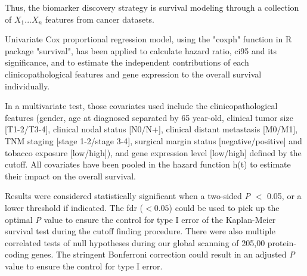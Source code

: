 \documentclass[jpm,article,submit,moreauthors,pdftex]{Definitions/mdpi}
\newenvironment{MyColorPar}[1]{%
    \leavevmode\color{#1}\ignorespaces%
}{%
}%
\begin{document}
\begin{paracol}{2}
\begin{MyColorPar}{red}
Thus, the biomarker discovery strategy is survival modeling through a collection of $X_1...X_n$ features from cancer datasets.%

Univariate Cox proportional regression model, using the "coxph" function in R package "survival", has been applied to calculate hazard ratio, \acrfull{ci95} and its significance, and to estimate the independent contributions of each clinicopathological features and gene expression to the overall survival individually.


In a multivariate test, those covariates used include the clinicopathological features (gender, age at diagnosed separated by 65 year-old, clinical tumor size [T1-2/T3-4], clinical nodal status [N0/N+], clinical distant metastasis [M0/M1], TNM staging [stage 1-2/stage 3-4], surgical margin status [negative/positive] and tobacco exposure [low/high]), and gene expression level [low/high] defined by the cutoff.
All covariates have been pooled in the hazard function h(t) to estimate their impact on the overall survival.
\end{MyColorPar} %


Results were considered statistically significant when a two-sided \textit{P} $<$ 0.05, or a lower threshold if indicated.
The \acrfull{fdr} ($< 0.05$) could be used to pick up the optimal \textit{P} value to ensure the control for type I error of the Kaplan-Meier survival test during the cutoff finding procedure.
There were also multiple correlated tests of null hypotheses 
during our global scanning of 205,00 protein-coding genes. The stringent Bonferroni correction could result in an adjusted \textit{P} value to ensure the control for type I error. 


\end{paracol}
\end{document}
